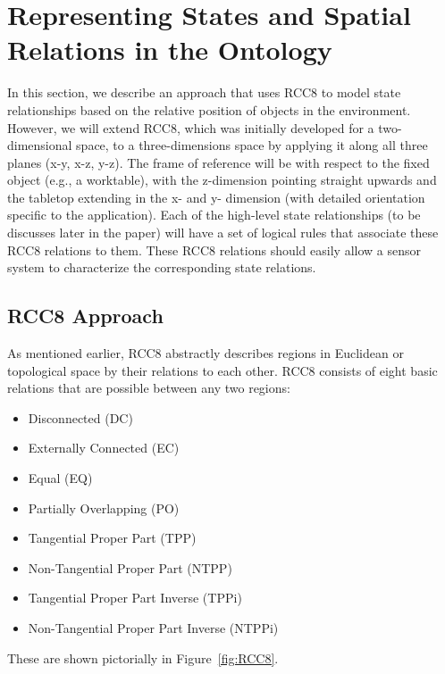 \documentclass[preprint,12pt]{elsarticle}
\begin{document}
\section{Representing States and Spatial Relations in the Ontology}\label{S:section2}
In this section, we describe an approach that uses RCC8 to model state relationships based on the relative position of objects in the environment. However, we will extend RCC8, which was initially developed for a two-dimensional space, to a three-dimensions space by applying it along all three planes (x-y, x-z, y-z). The frame of reference will be with respect to the fixed object (e.g., a worktable), with the z-dimension pointing straight upwards and the tabletop extending in the x- and y- dimension (with detailed orientation specific to the application).  Each of the high-level state relationships (to be discusses later in the paper) will have a set of logical rules that associate these RCC8 relations to them. These RCC8 relations should easily allow a sensor system to characterize the corresponding state relations.

\subsection{RCC8 Approach}
As mentioned earlier, RCC8 abstractly describes regions in Euclidean or topological space by their relations to each other. RCC8 consists of eight basic relations that are possible between any two regions:

\begin{itemize}
  \item Disconnected (DC)
  \item Externally Connected (EC)
  \item Equal (EQ)
  \item Partially Overlapping (PO)
  \item Tangential Proper Part (TPP)
  \item Non-Tangential Proper Part (NTPP)
  \item Tangential Proper Part Inverse (TPPi)
  \item Non-Tangential Proper Part Inverse (NTPPi)
\end{itemize}

These are shown pictorially in Figure~\ref{fig:RCC8}.
\end{document}
